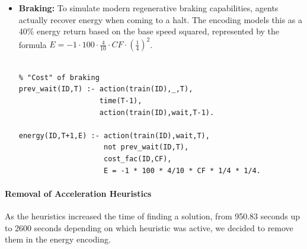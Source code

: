 \begin{itemize}
\begin{verbatim}
% Cost of turning
energy(ID,T2,E) :- position(ID,_,T,Dir1),
                   temp_speed(ID,T,S),
                   T2 = T + S,
                   position(ID,_,T2,Dir2),
                   Dir1 != Dir2,
                   cost_fac(ID,CF),
                   E = 100 * CF * 1/S * 1/S  * 11/10.

  \end{verbatim}
  \item \textbf{Braking:} To simulate modern regenerative braking capabilities, agents actually recover energy when coming to a halt. The encoding models this as a 40\% energy return based on the base speed squared, represented by the formula $E = -1 \cdot 100 \cdot \frac{4}{10} \cdot CF \cdot \left(\frac{1}{4}\right)^2$.
  \begin{verbatim}

% "Cost" of braking
prev_wait(ID,T) :- action(train(ID),_,T),
                   time(T-1),
                   action(train(ID),wait,T-1).
                   
energy(ID,T+1,E) :- action(train(ID),wait,T),
                    not prev_wait(ID,T),
                    cost_fac(ID,CF),
                    E = -1 * 100 * 4/10 * CF * 1/4 * 1/4.
  \end{verbatim}
\end{itemize}

\paragraph{Removal of Acceleration Heuristics}
As the heuristics increased the time of finding a solution, from 950.83 seconds up to 2600 seconds depending on which heuristic was active, we decided to remove them in the energy encoding.